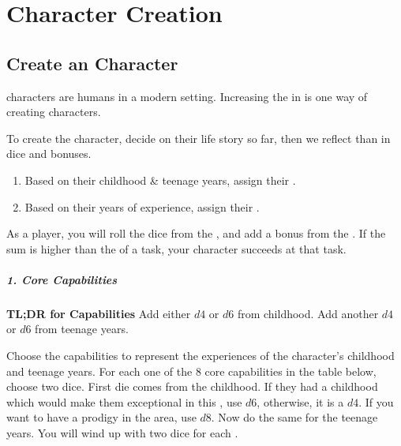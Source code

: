 \chapterspaceabove{2.75cm}
\chapterspacebelow{5.25cm}


\chapter{Character Creation}

\section{Create an  Character}
\begin{marginNote}
	 characters are humans in a modern setting.
	Increasing the  in 
	is one way of creating  characters.
\end{marginNote}
To create the character, decide on their life story so far,
then we reflect than in dice and bonuses.
\begin{enumerate}
	\item Based on their childhood \& teenage years, assign their .
	\item Based on their years of experience, assign their .
\end{enumerate}

As a player, you will roll the dice from the ,
and add a bonus from the .
If the sum is higher than the  of a task,
your character succeeds at that task.

\paragraph*{1. Core Capabilities}

\begin{marginNote}
	\textbf{TL;DR for Capabilities}
	Add either $d4$ or $d6$ from childhood.
	Add another $d4$ or $d6$ from teenage years.
\end{marginNote}

Choose the capabilities to represent the experiences of the character's childhood and teenage years.
For each one of the 8 core capabilities in the table below, choose two dice.
First die comes from the childhood. If they had a childhood which would
make them exceptional in this , use $d6$, otherwise, it is a $d4$.
If you want to have a prodigy in the area, use $d8$.
Now do the same for the teenage years. You will wind up with
two dice for each .


